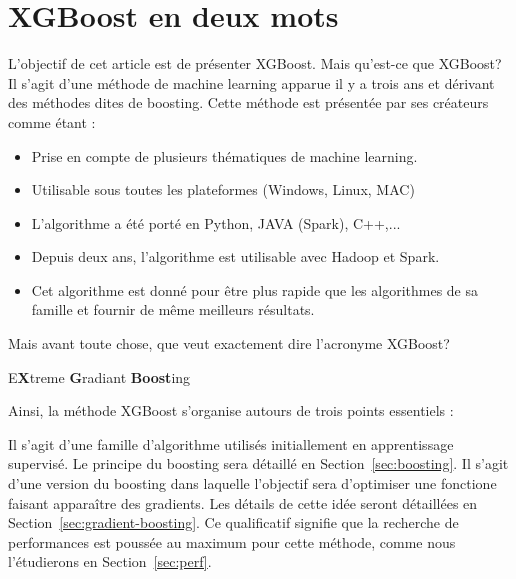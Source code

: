 \documentclass[11pt,a4paper]{article}
\begin{document}
%
%


%
%

\setcounter{page}{1}
\renewcommand*{\thepage}{\Roman{page}}

  

%
%

\renewcommand*{\thepage}{\arabic{page}}

%
%

\section{XGBoost en deux mots}\marginpar{\tableOfContents}
L'objectif de cet article est de présenter XGBoost. Mais qu'est-ce que XGBoost? Il s'agit d'une méthode de machine learning apparue il y a trois ans et dérivant des méthodes dites de boosting. Cette méthode est présentée par ses créateurs comme étant :
\begin{itemize}
	\item[\thColor{\faFlag~~Flexible}]Prise en compte de plusieurs thématiques de machine learning.
	\item[\thColor{\faCube~~Portable}]Utilisable sous toutes les plateformes (Windows, Linux, MAC)
	\item[\thColor{\faCommentsO~~Multi-langages}]L'algorithme a été porté en Python, JAVA (Spark), C++,...
	\item[\thColor{\faCloud~~Distribuée}]Depuis deux ans, l'algorithme est utilisable avec Hadoop et Spark.
	\item[\thColor{\faRocket~~Perfomante}]Cet algorithme est donné pour être plus rapide que les algorithmes de sa famille et fournir de même meilleurs résultats.
\end{itemize}
Mais avant toute chose, que veut exactement dire l'acronyme \og XGBoost\fg?
\begin{center}
E\textbf{\textcolor{bluenight}{X}}treme \textbf{\textcolor{bluenight}{G}}radiant \textbf{\textcolor{bluenight}{Boost}}ing
\end{center}
Ainsi, la méthode XGBoost s'organise autours de trois points essentiels :
\begin{itemize}
	Il s'agit d'une famille d'algorithme utilisés initiallement en apprentissage supervisé. Le principe du boosting sera détaillé en Section~\ref{sec:boosting}.
	Il s'agit d'une version du boosting dans laquelle l'objectif sera d'optimiser une fonctione faisant apparaître des gradients. Les détails de cette idée seront détaillées en Section~\ref{sec:gradient-boosting}.
	Ce qualificatif signifie que la recherche de performances est poussée au maximum pour cette méthode, comme nous l'étudierons en Section~\ref{sec:perf}.
\end{itemize}
\end{document}
